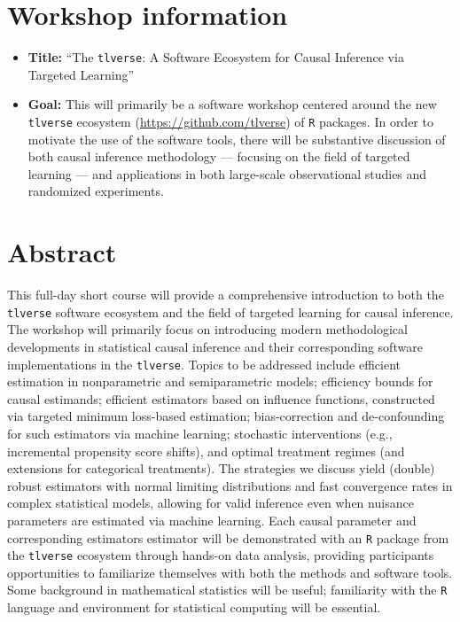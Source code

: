 \documentclass[a4paper,11pt]{texMemo}
\begin{document}
\maketitle

\vspace{-0.25in}
\section{Workshop information}

\begin{itemize}
  \itemsep1pt
  \item \textbf{Title:} ``The \texttt{tlverse}: A Software Ecosystem for Causal
    Inference via Targeted Learning''
  \item \textbf{Goal:} This will primarily be a software workshop centered
    around the new \texttt{tlverse} ecosystem (\url{https://github.com/tlverse})
    of \texttt{R} packages. In order to motivate the use of the software tools,
    there will be substantive discussion of both causal inference methodology
    --- focusing on the field of targeted learning --- and applications in both
    large-scale observational studies and randomized experiments.
\end{itemize}

\section{Abstract}

This full-day short course will provide a comprehensive introduction to both the
\texttt{tlverse} software ecosystem and the field of targeted learning for
causal inference. The workshop will primarily focus on introducing modern
methodological developments in statistical causal inference and their
corresponding software implementations in the \texttt{tlverse}. Topics to be
addressed include efficient estimation in nonparametric and semiparametric
models; efficiency bounds for causal estimands; efficient estimators based on
influence functions, constructed via targeted minimum loss-based estimation;
bias-correction and de-confounding for such estimators via machine learning;
stochastic interventions (e.g., incremental propensity score shifts), and
optimal treatment regimes (and extensions for categorical treatments). The
strategies we discuss yield (double) robust estimators with normal limiting
distributions and fast convergence rates in complex statistical models, allowing
for valid inference even when nuisance parameters are estimated via machine
learning. Each causal parameter and corresponding estimators estimator will be
demonstrated with an \texttt{R} package from the \texttt{tlverse} ecosystem
through hands-on data analysis, providing participants opportunities to
familiarize themselves with both the methods and software tools. Some
background in mathematical statistics will be useful; familiarity with the
\texttt{R} language and environment for statistical computing will be essential.
\end{document}
